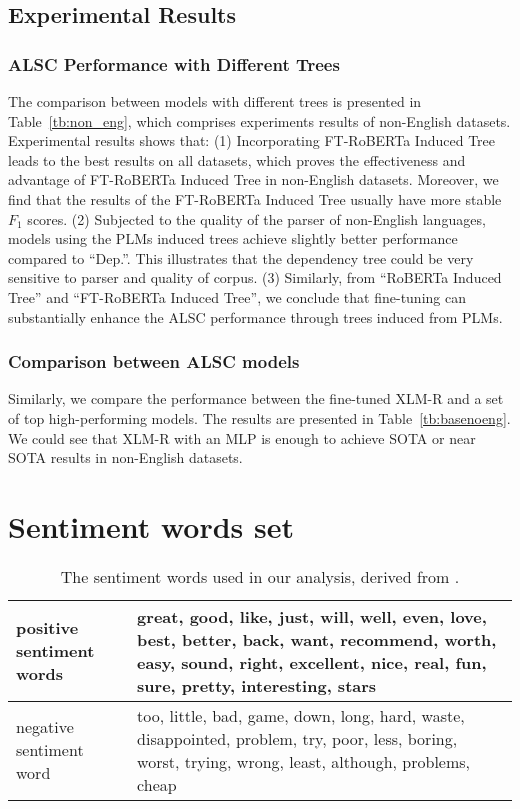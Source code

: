 \documentclass[11pt]{article}
\begin{document}
\subsection{Experimental Results}
\subsubsection{ALSC Performance with Different Trees}
The comparison between models with different trees is presented in Table~\ref{tb:non_eng}, which comprises experiments results of non-English datasets.
Experimental results shows that:
(1) Incorporating FT-RoBERTa Induced Tree leads to the best results on all datasets, which proves the effectiveness and advantage of FT-RoBERTa Induced Tree in non-English datasets. Moreover, we find that the results of  the FT-RoBERTa Induced Tree usually have more stable $F_1$ scores.
(2) Subjected to the quality of the parser of non-English languages, models using the PLMs induced trees achieve slightly better performance compared to ``Dep.''. This illustrates that the dependency tree could be very sensitive to parser and quality of  corpus.
(3) Similarly, from ``RoBERTa Induced Tree'' and ``FT-RoBERTa Induced Tree'', we  conclude that fine-tuning can substantially enhance the ALSC performance through trees induced from PLMs.





\subsubsection{Comparison between ALSC models}
Similarly, we compare the performance between the fine-tuned XLM-R and a set of top high-performing models. The results are presented in Table~\ref{tb:basenoeng}. We could see that XLM-R with an MLP is enough to achieve SOTA or near SOTA results in non-English datasets.

\section{Sentiment words set}

\begin{table}[h]
  \centering
  \begin{tabular}{|m{2cm}|m{4.5cm}|}
    \hline
    positive sentiment words & great, good, like, just, will, well, even, love, best, better, back, want, recommend, worth, easy, sound, right, excellent, nice, real, fun, sure, pretty, interesting, stars \\
    \hline
    negative sentiment word  & too, little, bad, game, down, long, hard, waste, disappointed, problem, try, poor, less, boring, worst, trying, wrong, least, although, problems, cheap                       \\
    \hline
  \end{tabular}
  \caption{The sentiment words used in our analysis, derived from \citet{DBLP:conf/acl/TianGXLHWWW20}. }
  \label{tb:senti}
\end{table}
\end{document}
